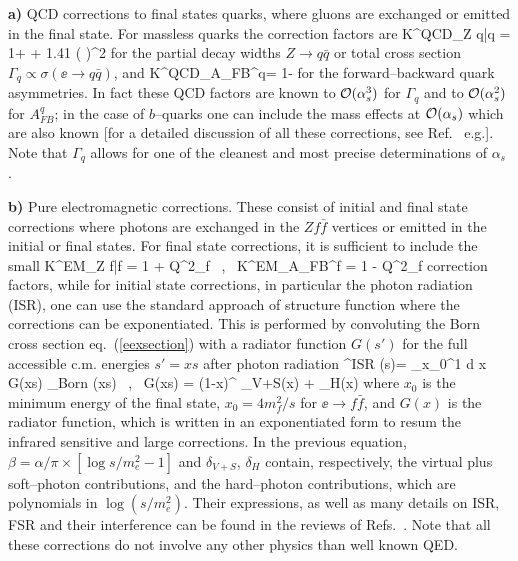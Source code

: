 {\bf a)} QCD corrections to final states quarks, where gluons are exchanged or
emitted in the final state. For massless quarks the correction factors  are
\beq
K^{\rm QCD}_{Z \to q\bar{q}} = 1+  + 1.41 
\left( \right)^2
\label{GammaQCD}
\eeq
for the partial decay widths $Z \to q\bar{q}$ or total cross section $\Gamma_q 
\propto \sigma( \ee \to q \bar{q})$, and 
\beq
K^{\rm QCD}_{A_{\rm FB}^{q}}= 1- 
\eeq
for the forward--backward quark asymmetries. In fact these QCD factors are 
known to ${\cal O}(\alpha_s^3)$ for $\Gamma_q$ and  to ${\cal O}(\alpha_s^2)$ 
for $A_{FB}^q$; in the case of $b$--quarks one can include the mass effects at 
${\cal O} (\alpha_s)$ which are also known  [for a detailed
discussion of all these corrections, see Ref.~\cite{Z-Precision2} e.g.].
Note that $\Gamma_q$ allows for one of the cleanest and most precise 
determinations of $\alpha_s$ \cite{alphas-review}.\s

{\bf b)} Pure electromagnetic corrections. These consist of initial and final
state corrections where photons are exchanged in the $Zf\bar{f}$ vertices or
 emitted in the initial or final states. For final state corrections, it is
sufficient to include the small 
\beq
K^{\rm EM}_{Z \to f\bar{f}} = 1 + Q^2_f \frac{\alpha}{\pi}
\ , \ 
K^{\rm EM}_{A_{FB}^{f}} = 1 - Q^2_f \frac{\alpha}{\pi}
\eeq
correction factors, while for  initial state corrections, in particular the
photon radiation (ISR), one can use the  standard approach of structure
function where the corrections can be exponentiated. This is performed 
by convoluting the Born cross section eq.~(\ref{eexsection}) with
a radiator function $G(s')$ for the full accessible c.m. energies $s'=xs$ 
after photon radiation 
\beq
\sigma^{\rm ISR} (s)= \int_{x_0}^1 {\rm d} x \, G(xs) \sigma_{\rm Born} (xs)
\ , \ G(xs) = \beta (1-x)^{\beta-1} \delta_{V+S}(x) + \delta_H(x)
\label{QEDradiator}
\eeq
where $x_0$ is the minimum energy of the final state, $x_0= 4m_f^2/s$ for  $\ee
\to f\bar{f}$, and $G(x)$ is the radiator function, which is written in an
exponentiated form to resum the infrared sensitive and large corrections. In the
previous equation, $\beta= \alpha/\pi \times [\log s/m_e^2 -1]$ and
$\delta_{V+S}$, $\delta_H$ contain, respectively,  the virtual plus
soft--photon contributions, and  the  hard--photon contributions, which are
polynomials in  $\log(s/m_e^2)$. Their expressions, as well as many details on
ISR, FSR and their interference can be found in the reviews of 
Refs.~\cite{Z-Physics2,Z-Physics4}.  Note that all these corrections 
do not involve any other physics than well known QED.\s

